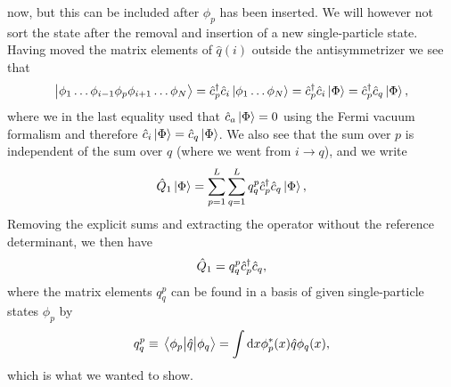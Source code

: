         now, but this can be included after $\phi_p$ has been inserted.
        We will however not sort the state after the removal and insertion of a
        new single-particle state.
        Having moved the matrix elements of $\hat{q}(i)$ outside the
        antisymmetrizer we see that
        \begin{align}
            \ket{\phi_1\dots\phi_{i - 1}\phi_p\phi_{i + 1}\dots\phi_N}
            = \hat{c}_{p}^{\dagger}\hat{c}_{i}\ket{\phi_1\dots\phi_N}
            = \hat{c}_{p}^{\dagger}\hat{c}_{i}\ket{\Phi}
            = \hat{c}_{p}^{\dagger}\hat{c}_{q}\ket{\Phi},
        \end{align}
        where we in the last equality used that $\hat{c}_{a}\ket{\Phi} = 0$ using
        the Fermi vacuum formalism and therefore $\hat{c}_{i}\ket{\Phi} =
        \hat{c}_{q}\ket{\Phi}$.
        We also see that the sum over $p$ is independent of the sum over
        $q$ (where we went from $i \to q$), and we write
        \begin{align}
            \hat{Q}_1\ket{\Phi}
            = \sum_{p = 1}^{L}\sum_{q = 1}^{L}q^{p}_{q}
            \hat{c}_{p}^{\dagger}\hat{c}_{q}\ket{\Phi},
        \end{align}
        Removing the explicit sums and extracting the operator without the
        reference determinant, we then have
        \begin{align}
            \hat{Q}_1 = q^{p}_{q}\hat{c}_{p}^{\dagger}\hat{c}_{q},
        \end{align}
        where the matrix elements $q^{p}_{q}$ can be found in a basis of given
        single-particle states $\phi_p$ by
        \begin{align}
            q^{p}_{q}
            \equiv
            \mel{\phi_p}{\hat{q}}{\phi_q}
            = \int\dd x\phi^{*}_{p}(x)\hat{q}\phi_{q}(x),
        \end{align}
        which is what we wanted to show.

